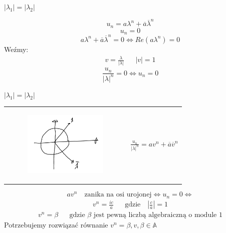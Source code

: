 \documentclass[handout]{beamer}
\def\A{\mathbb{A}}
\theoremstyle{definition}
\theoremstyle{named}
\begin{document}
\begin{frame}{$|\lambda_1| = |\lambda_2|$}

\begin{equation*}
    u_n = a \lambda^{n} + \overline{a} \overline{\lambda}^{n} 
\end{equation*}
\pause 
\begin{equation*}
    u_n = 0 
\end{equation*}
\pause 
\begin{equation*}
    a \lambda^{n} + \overline{a} \overline{\lambda}^{n} = 0 \iff Re(a {\lambda^{n}}) = 0 
\end{equation*} 
\pause
Weźmy: 
\begin{align*}
    v = \frac{\lambda}{|\lambda|} && |v| = 1
\end{align*}
$$\frac{u_n}{|\lambda|^{n}} = 0 \iff u_n = 0$$

\end{frame}
    
\begin{frame}{$|\lambda_1| = |\lambda_2|$}
\begin{table}[]
    \centering
    \begin{tabular}{c c}
       \begin{figure}
            \centering
            \includegraphics[width=40mm]{img/Zaznaczenie_081.png}
        \end{figure}  & 
            $\frac{u_n}{|\lambda|^n} = a v^{n} + \overline{a} \overline{v} ^{n} $
 
    \end{tabular}
\end{table}

\begin{equation*}
    a v^{n} \quad  \text{zanika na osi urojonej} \iff u_n = 0 \iff 
\end{equation*}
\begin{align*}
    v^{n} = \frac{i c}{a} && \text{gdzie} \quad |\frac{c}{a}| = 1
\end{align*}
\begin{align*}
    v^{n} = \beta && \text{gdzie $\beta$ jest pewną liczbą algebraiczną o module 1}
\end{align*}
\pause
Potrzebujemy rozwiązać równanie $v^{n} = \beta, v, \beta \in \A$

\end{frame}
\end{document}
